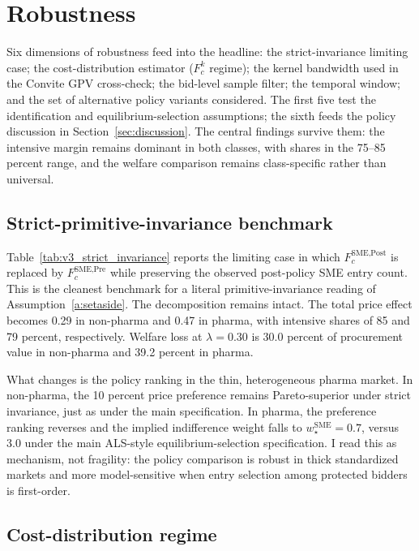 \section{Robustness}\label{sec:robustness}

Six dimensions of robustness feed into the headline: the strict-invariance limiting case; the cost-distribution estimator ($F_c^k$ regime); the kernel bandwidth used in the Convite GPV cross-check; the bid-level sample filter; the temporal window; and the set of alternative policy variants considered. The first five test the identification and equilibrium-selection assumptions; the sixth feeds the policy discussion in Section~\ref{sec:discussion}. The central findings survive them: the intensive margin remains dominant in both classes, with shares in the 75--85 percent range, and the welfare comparison remains class-specific rather than universal.

\subsection{Strict-primitive-invariance benchmark}

Table~\ref{tab:v3_strict_invariance} reports the limiting case in which $F_c^{\text{SME,Post}}$ is replaced by $F_c^{\text{SME,Pre}}$ while preserving the observed post-policy SME entry count. This is the cleanest benchmark for a literal primitive-invariance reading of Assumption~\ref{a:setaside}. The decomposition remains intact. The total price effect becomes 0.29 in non-pharma and 0.47 in pharma, with intensive shares of 85 and 79 percent, respectively. Welfare loss at $\lambda = 0.30$ is 30.0 percent of procurement value in non-pharma and 39.2 percent in pharma.

What changes is the policy ranking in the thin, heterogeneous pharma market. In non-pharma, the 10 percent price preference remains Pareto-superior under strict invariance, just as under the main specification. In pharma, the preference ranking reverses and the implied indifference weight falls to $w^{\text{SME}}_\star = 0.7$, versus 3.0 under the main ALS-style equilibrium-selection specification. I read this as mechanism, not fragility: the policy comparison is robust in thick standardized markets and more model-sensitive when entry selection among protected bidders is first-order.

\subsection{Cost-distribution regime}

